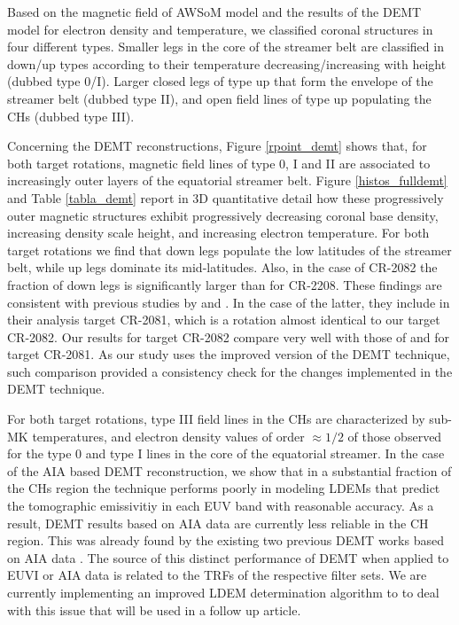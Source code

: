\documentclass[namedreferences]{solarphysics}
\begin{document}
\begin{article}
{Based on the magnetic field of AWSoM model and the results of the DEMT model for electron density and temperature, we classified coronal structures in four different types. Smaller legs in the core of the streamer belt are classified in down/up types according to their temperature decreasing/increasing with height (dubbed type 0/I). Larger closed legs of type up that form the envelope of the streamer belt (dubbed type II), and open field lines of type up populating the CHs (dubbed type III).}

Concerning the DEMT reconstructions, Figure \ref{rpoint_demt} shows that, for both target rotations, magnetic field lines of type 0, I and II are associated to increasingly outer {layers} of the equatorial streamer belt. Figure \ref{histos_fulldemt} and Table \ref{tabla_demt} report in 3D quantitative detail how these progressively outer magnetic structures exhibit progressively decreasing coronal base density, increasing density scale height, and increasing electron temperature. For both target rotations we find that down legs populate the low latitudes of the streamer belt, while up legs dominate its mid-latitudes. Also, in the case of CR-2082 the fraction of down legs is significantly larger than for CR-2208. These findings are consistent with previous studies by \citet{huang_2012} and \citet{nuevo_2013}. In the case of the latter, they include in their analysis target CR-2081, which is a rotation almost identical to our target CR-2082. Our results for target CR-2082 compare very well with those of \citet{nuevo_2015} and \citet{lloveras_2017} for target CR-2081. As our study uses the improved version of the DEMT technique, such comparison provided a consistency check for the changes implemented in the DEMT technique.



{{For both target rotations}, type III field lines in the CHs are characterized by sub-MK temperatures, and electron density values of order $\approx 1/2$ of those observed for the type 0 and type I lines in the core of the equatorial streamer. In the case of the AIA based DEMT reconstruction, we show that in a substantial fraction of the CHs region the technique performs poorly in modeling LDEMs that predict the tomographic emissivitiy in each EUV band with reasonable accuracy. As a result, DEMT results based on AIA data are currently less reliable in the CH region. This was already found by the existing two previous DEMT works based on AIA data \citep{nuevo_2015,maccormack_2017}. The source of this distinct performance of DEMT when applied to EUVI or AIA data is related to the TRFs of the respective filter sets. We are currently implementing an improved LDEM determination algorithm to to deal with this issue that will be used in a follow up article.}


\end{article}
\end{document}
